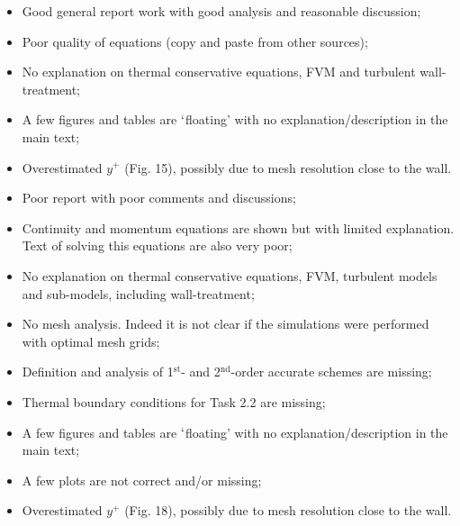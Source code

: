 \documentclass[14pt,twoside]{report}
\newcommand\blankpage{%
    \null
    \thispagestyle{empty}%
    \addtocounter{page}{-1}%
    \newpage}
\begin{document}
\medskip

  \begin{itemize}
%
     \item Good general report work with good analysis and reasonable discussion;
     \item Poor quality of equations (copy and paste from other sources);
     \item No explanation on thermal conservative equations, FVM and turbulent wall-treatment;
     \item A few figures and tables are $\lq$floating' with no explanation/description in the main text;
     \item Overestimated $y^{+}$ (Fig. 15), possibly due to mesh resolution close to the wall.
%
  \end{itemize}%

\clearpage 





\bigskip


\medskip

  \begin{itemize}
%
     \item Poor report with poor comments and discussions;
     \item Continuity and momentum equations are shown but with limited explanation. Text of solving this equations are also very poor;
     \item No explanation on thermal conservative equations, FVM, turbulent models and sub-models, including  wall-treatment;%
     \item No mesh analysis. Indeed it is not clear if the simulations were performed with optimal mesh grids;
     \item Definition and analysis of 1$^{\text{st}}$- and 2$^{\text{nd}}$-order accurate schemes are missing;
     \item Thermal boundary conditions for Task 2.2 are missing;
     \item A few figures and tables are $\lq$floating' with no explanation/description in the main text;
     \item A few plots are not correct and/or missing;
     \item Overestimated $y^{+}$ (Fig. 18), possibly due to mesh resolution close to the wall.
%
  \end{itemize}%
\end{document}
